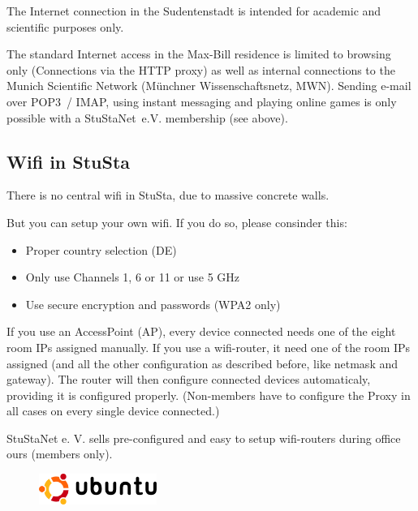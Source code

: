 \documentclass[a4paper,12pt]{scrartcl}
\begin{document}
The Internet connection in the Sudentenstadt is intended for academic and scientific purposes only.

The standard Internet access in the Max-Bill residence is limited to browsing only (Connections via the HTTP proxy) as well as internal connections to the Munich Scientific Network (Münchner Wissenschaftsnetz, MWN). Sending e-mail over POP3~/ IMAP, using instant messaging and playing online games is only possible with a StuStaNet~e.V. membership (see above).

\subsection*{Wifi in StuSta}
There is no central wifi in StuSta, due to massive concrete walls.

But you can setup your own wifi. If you do so, please consinder this:
\begin{itemize}
    \item Proper country selection (DE)
    \item Only use Channels 1, 6 or 11 or use 5 GHz
    \item Use secure encryption and passwords (WPA2 only)
\end{itemize}

If you use an AccessPoint (AP), every device connected needs one of the eight room IPs assigned manually. If you use a wifi-router, it need one of the room IPs assigned (and all the other configuration as described before, like netmask and gateway). The router will then configure connected devices automaticaly, providing it is configured properly. (Non-members have to configure the Proxy in all cases on every single device connected.)

\vspace{2em}

StuStaNet e. V. sells pre-configured and easy to setup wifi-routers during office ours (members only).

\newpage

\begin{figure}[t!]
    \raggedleft
    \vspace{-20pt}
    \includegraphics[height=1cm,keepaspectratio]{Bilder/Ubuntu_logo}
    \vspace{-30pt}
\end{figure}
\end{document}
